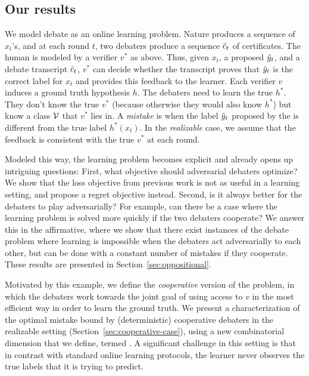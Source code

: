 \subsection{Our results}
We model debate as an online learning problem. Nature produces a sequence of $x_t$'s, and at each round $t$, two debaters produce a sequence $\sc_t$ of certificates. The human is modeled by a verifier $v^*$ as above. Thus, given $x_t$, a proposed $\hy_t$, and a debate transcript $\sc_t$, $v^*$ can decide whether the transcript proves that $\hy_t$ is the correct label for $x_t$ and provides this feedback to the learner. Each verifier $v$ induces a ground truth hypothesis $h$. The debaters need to learn the true $h^*$. They don't know the true $v^*$ (because otherwise they would also know $h^*$) but know a class $\V$ that $v^*$ lies in. A \emph{mistake} is when the label $\hy_t$ proposed by the \dt is different from the true label $h^*(x_t)$. In the \emph{realizable} case, we assume that  the feedback is consistent with the true $v^*$ at each round.

Modeled this way, the learning problem becomes explicit and already opens up intriguing questions: First, what objective should adversarial debaters optimize? We show that the loss objective from previous work is not as useful in a learning setting, and propose a regret objective instead. Second, is it always better for the debaters to play adversarially? For example, can there be a case where the learning problem is solved more quickly if the two debaters cooperate? We answer this in the affirmative, where we show that there exist instances of the debate problem where learning is impossible when the debaters act adversarially to each other, but can be done with a constant number of mistakes if they cooperate. These results are presented in Section~\ref{sec:oppositional}.

Motivated by this example, we define the \emph{cooperative} version of the problem,
in which the debaters work towards the joint goal of using access to $v$ in the most efficient way in order to learn the ground truth. We present a characterization of the optimal mistake bound by (deterministic) cooperative debaters in the realizable setting (Section~\ref{sec:cooperative-case}), using a new combinatorial dimension that we define, termed \emph{\debatedimname}. A significant challenge in this setting is that in contrast with standard online learning protocols, the learner never observes the true labels that it is trying to predict. 

